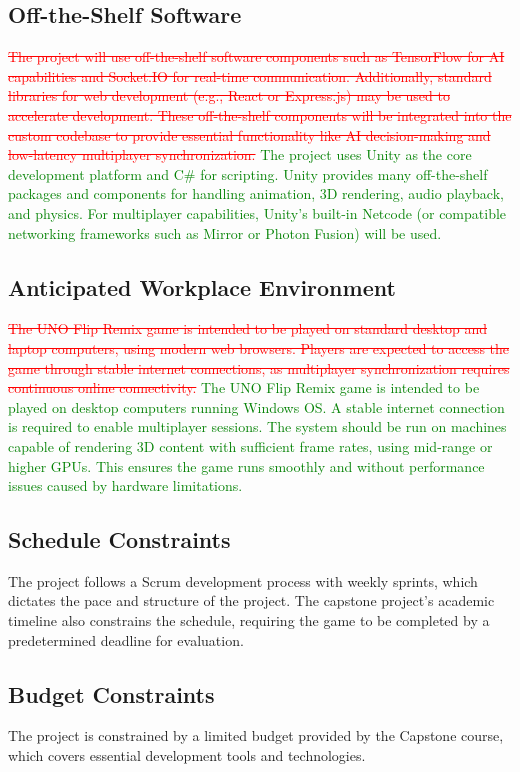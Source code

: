 \documentclass[12pt]{article}
\newcommand{\removed}[1]{\textcolor{red}{\sout{#1}}}
\newcommand{\added}[1]{\textcolor{green}{#1}}
\begin{document}
\subsection{Off-the-Shelf Software}
\removed{The project will use off-the-shelf software components such as TensorFlow for AI capabilities and Socket.IO for real-time communication. Additionally, standard libraries for web development (e.g., React or Express.js) may be used to accelerate development. These off-the-shelf components will be integrated into the custom codebase to provide essential functionality like AI decision-making and low-latency multiplayer synchronization.} \added{The project uses Unity as the core development platform and C\# for scripting. Unity provides many off-the-shelf packages and components for handling animation, 3D rendering, audio playback, and physics. For multiplayer capabilities, Unity’s built-in Netcode (or compatible networking frameworks such as Mirror or Photon Fusion) will be used.}

\subsection{Anticipated Workplace Environment}
\removed{The UNO Flip Remix game is intended to be played on standard desktop and laptop computers, using modern web browsers. Players are expected to access the game through stable internet connections, as multiplayer synchronization requires continuous online connectivity.} \added{The UNO Flip Remix game is intended to be played on desktop computers running Windows OS. A stable internet connection is required to enable multiplayer sessions. The system should be run on machines capable of rendering 3D content with sufficient frame rates, using mid-range or higher GPUs. This ensures the game runs smoothly and without performance issues caused by hardware limitations.}

\subsection{Schedule Constraints}
The project follows a Scrum development process with weekly sprints, which dictates the pace and structure of the project. The capstone project's academic timeline also constrains the schedule, requiring the game to be completed by a predetermined deadline for evaluation.

\subsection{Budget Constraints}
The project is constrained by a limited budget provided by the Capstone course, which covers essential development tools and technologies.
\end{document}
